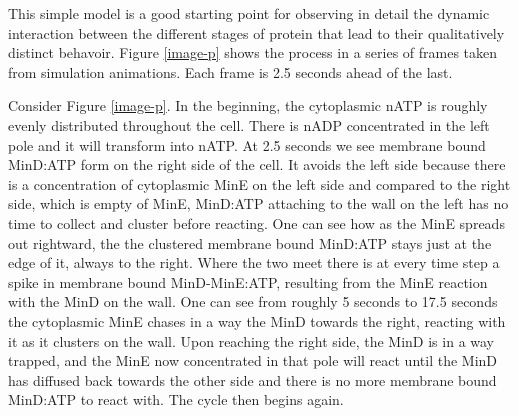 \documentclass[letterpaper,twocolumn,amsmath,amssymb,pre]{revtex4-1}
\begin{document}
This simple model is a good starting point for observing in detail the
dynamic interaction between the different stages of protein that lead
to their qualitatively distinct behavoir. Figure \ref{image-p} shows
the process in a series of frames taken from simulation animations.
Each frame is 2.5 seconds ahead of the last.

Consider Figure \ref{image-p}.  In the beginning, the cytoplasmic
nATP is roughly evenly distributed throughout the cell.  There is nADP
concentrated in the left pole and it will transform into nATP.  At 2.5
seconds we see membrane bound MinD:ATP form on the right side of the
cell.  It avoids the left side because there is a concentration of
cytoplasmic MinE on the left side and compared to the right side,
which is empty of MinE, MinD:ATP attaching to the wall on the left has
no time to collect and cluster before reacting.  One can see how as
the MinE spreads out rightward, the the clustered membrane bound
MinD:ATP stays just at the edge of it, always to the right.  Where the
two meet there is at every time step a spike in membrane bound
MinD-MinE:ATP, resulting from the MinE reaction with the MinD on the
wall.  One can see from roughly 5 seconds to 17.5 seconds the
cytoplasmic MinE chases in a way the MinD towards the right, reacting
with it as it clusters on the wall.  Upon reaching the right side, the
MinD is in a way trapped, and the MinE now concentrated in that pole
will react until the MinD has diffused back towards the other side and
there is no more membrane bound MinD:ATP to react with.  The cycle
then begins again.
\end{document}

